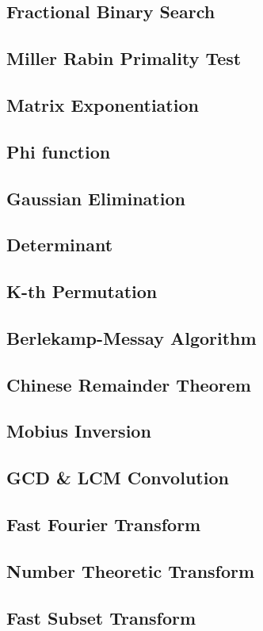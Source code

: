 \newpage

\subsection{Fractional Binary Search}
\subsection{Miller Rabin Primality Test}
\subsection{Matrix Exponentiation}
\subsection{Phi function}
\subsection{Gaussian Elimination}
\subsection{Determinant}
\subsection{K-th Permutation}
\subsection{Berlekamp-Messay Algorithm}
\subsection{Chinese Remainder Theorem}
\subsection{Mobius Inversion}
\subsection{GCD \& LCM Convolution}
\subsection{Fast Fourier Transform} 
\subsection{Number Theoretic Transform}
\subsection{Fast Subset Transform}
